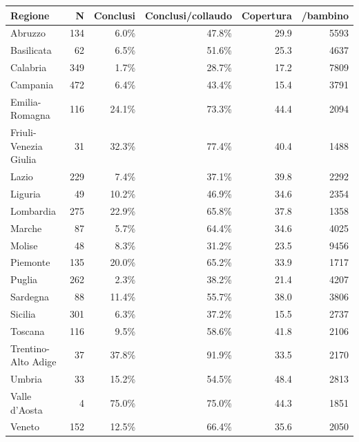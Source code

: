 \begin{tabular}{lrrrrr}
\toprule
Regione & N & Conclusi & Conclusi/collaudo & Copertura & \texteuro{}/bambino \\
\midrule
Abruzzo & 134 & 6.0\% & 47.8\% & 29.9 & 5593 \\
Basilicata & 62 & 6.5\% & 51.6\% & 25.3 & 4637 \\
Calabria & 349 & 1.7\% & 28.7\% & 17.2 & 7809 \\
Campania & 472 & 6.4\% & 43.4\% & 15.4 & 3791 \\
Emilia-Romagna & 116 & 24.1\% & 73.3\% & 44.4 & 2094 \\
Friuli-Venezia Giulia & 31 & 32.3\% & 77.4\% & 40.4 & 1488 \\
Lazio & 229 & 7.4\% & 37.1\% & 39.8 & 2292 \\
Liguria & 49 & 10.2\% & 46.9\% & 34.6 & 2354 \\
Lombardia & 275 & 22.9\% & 65.8\% & 37.8 & 1358 \\
Marche & 87 & 5.7\% & 64.4\% & 34.6 & 4025 \\
Molise & 48 & 8.3\% & 31.2\% & 23.5 & 9456 \\
Piemonte & 135 & 20.0\% & 65.2\% & 33.9 & 1717 \\
Puglia & 262 & 2.3\% & 38.2\% & 21.4 & 4207 \\
Sardegna & 88 & 11.4\% & 55.7\% & 38.0 & 3806 \\
Sicilia & 301 & 6.3\% & 37.2\% & 15.5 & 2737 \\
Toscana & 116 & 9.5\% & 58.6\% & 41.8 & 2106 \\
Trentino-Alto Adige & 37 & 37.8\% & 91.9\% & 33.5 & 2170 \\
Umbria & 33 & 15.2\% & 54.5\% & 48.4 & 2813 \\
Valle d'Aosta & 4 & 75.0\% & 75.0\% & 44.3 & 1851 \\
Veneto & 152 & 12.5\% & 66.4\% & 35.6 & 2050 \\
\bottomrule
\end{tabular}
